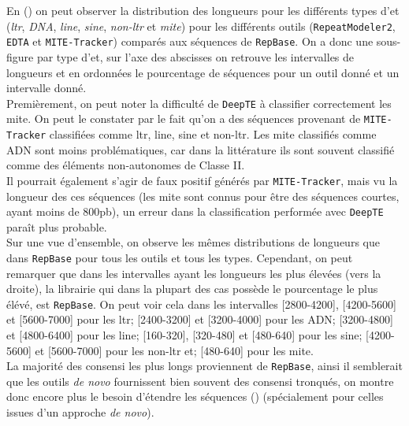 \documentclass[10pt]{article}
\begin{document}
En \figureautorefname{ \ref{fig:dist_length}} (\linkautorefname{\ref{link9}}) on peut observer la distribution des longueurs pour les différents types d'\acrshort{et} (\textit{\acrshort{ltr}}, \textit{DNA}, \textit{\acrshort{line}}, \textit{\acrshort{sine}}, \textit{non-\acrshort{ltr}} et \textit{\acrshort{mite}}) pour les différents outils (\texttt{RepeatModeler2}, \texttt{EDTA} et \texttt{MITE-Tracker}) comparés aux séquences de \texttt{RepBase}. On a donc une sous-figure par type d'\acrshort{et}, sur l'axe des abscisses on retrouve les intervalles de longueurs et en ordonnées le pourcentage de séquences pour un outil donné et un intervalle donné. \\
Premièrement, on peut noter la difficulté de \texttt{DeepTE} à classifier correctement les \acrshort{mite}. On peut le constater par le fait qu'on a des séquences provenant de \texttt{MITE-Tracker} classifiées comme \acrshort{ltr}, \acrshort{line}, \acrshort{sine} et non-\acrshort{ltr}. Les \acrshort{mite} classifiés comme ADN sont moins problématiques, car dans la littérature ils sont souvent classifié comme des éléments non-autonomes de Classe II. \\
Il pourrait également s'agir de faux positif générés par \texttt{MITE-Tracker}, mais vu la longueur des ces séquences (les \acrshort{mite} sont connus pour être des séquences courtes, ayant moins de 800pb), un erreur dans la classification performée avec \texttt{DeepTE} paraît plus probable. \\
Sur une vue d'ensemble, on observe les mêmes distributions de longueurs que dans \texttt{RepBase} pour tous les outils et tous les types. Cependant, on peut remarquer que dans les intervalles ayant les longueurs les plus élevées (vers la droite), la librairie qui dans la plupart des cas possède le pourcentage le plus élévé, est \texttt{RepBase}. On peut voir cela dans les intervalles [2800-4200], [4200-5600] et [5600-7000] pour les \acrshort{ltr}; [2400-3200] et [3200-4000] pour les ADN; [3200-4800] et [4800-6400] pour les \acrshort{line}; [160-320], [320-480] et [480-640]  pour les \acrshort{sine}; [4200-5600] et [5600-7000] pour les non-\acrshort{ltr} et; [480-640] pour les \acrshort{mite}. \\
La majorité des consensi les plus longs proviennent de \texttt{RepBase}, ainsi il semblerait que les outils \textit{de novo} fournissent bien souvent des consensi tronqués, on montre donc encore plus le besoin d'étendre les séquences () (spécialement pour celles issues d'un approche \textit{de novo}). \\
\end{document}
